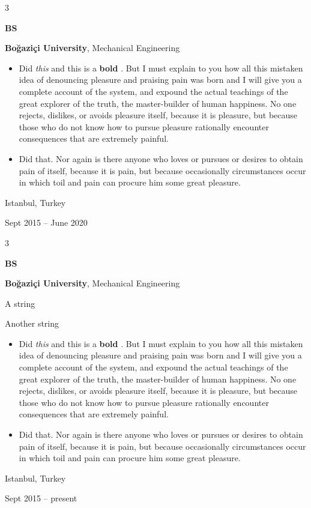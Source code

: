 \documentclass[10pt, letterpaper]{article}
\newenvironment{summary}{
    \begin{description}[
        topsep=0.10 cm,
        parsep=0.10 cm,
        partopsep=0pt,
        itemsep=0pt,
        leftmargin=0.4 cm + 10pt
    ]
}{
    \end{description}
} %
\newenvironment{highlights}{
    \begin{itemize}[
        topsep=0.10 cm,
        parsep=0.10 cm,
        partopsep=0pt,
        itemsep=0pt,
        leftmargin=0.4 cm + 10pt
    ]
}{
    \end{itemize}
} %
\newenvironment{threecolentry}[3][]{
    \onecolentry
    \def\thirdColumn{#3}
    \setcolumnwidth{1 cm, \fill, 4.5 cm}
    \begin{paracol}{3}
    {\raggedright #2} \switchcolumn
}{
    \switchcolumn \raggedleft \thirdColumn
    \end{paracol}
    \endonecolentry
} %
\let\hrefWithoutArrow\href
\renewcommand{\href}[2]{\hrefWithoutArrow{#1}{\ifthenelse{\equal{#2}{}}{ }{#2 }\raisebox{.15ex}{\footnotesize \faExternalLink*}}}
\begin{document}
        \begin{threecolentry}{\textbf{BS}}{
            Istanbul, Turkey

        Sept 2015 – June 2020
        }
            \textbf{Boğaziçi University}, Mechanical Engineering
            \begin{highlights}
                \item Did \textit{this} and this is a \textbf{bold} \href{https://example.com}{link}. But I must explain to you how all this mistaken idea of denouncing pleasure and praising pain was born and I will give you a complete account of the system, and expound the actual teachings of the great explorer of the truth, the master-builder of human happiness. No one rejects, dislikes, or avoids pleasure itself, because it is pleasure, but because those who do not know how to pursue pleasure rationally encounter consequences that are extremely painful.
                \item Did that. Nor again is there anyone who loves or pursues or desires to obtain pain of itself, because it is pain, but because occasionally circumstances occur in which toil and pain can procure him some great pleasure.
            \end{highlights}
        \end{threecolentry}

        \vspace{0.2 cm}

        \begin{threecolentry}{\textbf{BS}}{
            Istanbul, Turkey

        Sept 2015 – present
        }
            \textbf{Boğaziçi University}, Mechanical Engineering
            \begin{summary}
                \item A string
                \item Another string
            \end{summary}
            \begin{highlights}
                \item Did \textit{this} and this is a \textbf{bold} \href{https://example.com}{link}. But I must explain to you how all this mistaken idea of denouncing pleasure and praising pain was born and I will give you a complete account of the system, and expound the actual teachings of the great explorer of the truth, the master-builder of human happiness. No one rejects, dislikes, or avoids pleasure itself, because it is pleasure, but because those who do not know how to pursue pleasure rationally encounter consequences that are extremely painful.
                \item Did that. Nor again is there anyone who loves or pursues or desires to obtain pain of itself, because it is pain, but because occasionally circumstances occur in which toil and pain can procure him some great pleasure.
            \end{highlights}
        \end{threecolentry}
\end{document}
